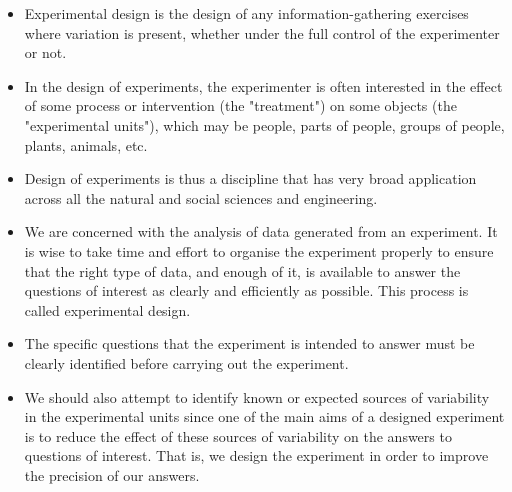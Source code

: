 \documentclass[12pt]{article}
\begin{document}
\begin{itemize}
\item Experimental design is the design of any information-gathering exercises where variation is present, whether under the full control of the experimenter or not. 


\item 
In the design of experiments, the experimenter is often interested in the effect of some process or intervention (the "treatment") on some objects (the "experimental units"), which may be people, parts of people, groups of people, plants, animals, etc. 

\item Design of experiments is thus a discipline that has very broad application across all the natural and social sciences and engineering.
\end{itemize}
\newpage
\begin{itemize}
\item  We are concerned with the analysis of data generated from an experiment. It is wise to take time and effort to organise the experiment properly to ensure that the right type of data, and enough of it, is available to answer the questions of interest as clearly and efficiently as possible. This process is called experimental design.
\item The specific questions that the experiment is intended to answer must be clearly identified before carrying out the experiment.
\item We should also attempt to identify known or expected sources of variability in the experimental units since one of the main aims of a designed experiment is to reduce the effect of these sources of variability on the answers to questions of interest. That is, we design the experiment in order to improve the precision of our answers.
\end{itemize}
\end{document}

